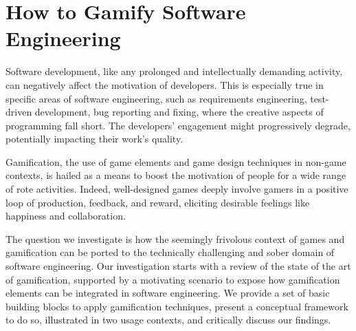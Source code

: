 \chapter{How to Gamify Software Engineering}





Software development, like any prolonged and intellectually demanding activity, can negatively affect the motivation of developers. This is especially true in specific areas of software engineering, such as requirements engineering, test-driven development, bug reporting and fixing, where the creative aspects of programming fall short. The developers' engagement might progressively degrade, potentially impacting their work's quality. 

Gamification, the use of game elements and game design techniques in non-game contexts, is hailed as a means to boost the motivation of people for a wide range of rote activities. Indeed, well-designed games deeply involve gamers in a positive loop of production, feedback, and reward, eliciting desirable feelings like happiness and collaboration. 

The question we investigate is how the seemingly frivolous context of games and gamification can be ported to the technically challenging and sober domain of software engineering. Our investigation starts with a review of the state of the art of gamification, supported by a motivating scenario to expose how gamification elements can be integrated in software engineering. We provide a set of basic building blocks to apply gamification techniques, present a conceptual framework to do so, illustrated in two usage contexts, and critically discuss our findings.




